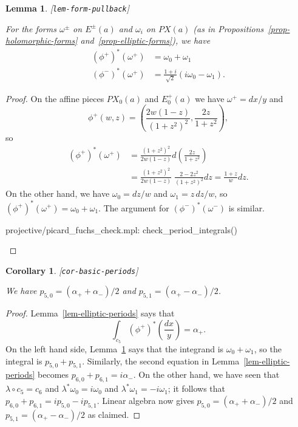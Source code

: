 \documentclass[reqno]{amsart}
\newcommand{\lbl}[1]{\label{#1}\textup{[\texttt{#1}]}\par}
\newcommand{\lbl}{\label}
\newcommand{\al}        {\alpha}
\newcommand{\lm}        {\lambda}
\newcommand{\om}        {\omega}
\newcommand{\rt}        {\sqrt{2}}
\renewcommand{\:}{\colon}
\newtheorem{lemma}[theorem]{Lemma}
\newtheorem{corollary}[theorem]{Corollary}
\theoremstyle{definition}
\begin{document}
\begin{lemma}\lbl{lem-form-pullback}
 For the forms $\om^{\pm}$ on $E^{\pm}(a)$ and $\om_i$ on $PX(a)$ (as in
 Propositions~\ref{prop-holomorphic-forms}
 and~\ref{prop-elliptic-forms}), we have
 \begin{align*}
  (\phi^+)^*(\om^+) &= \om_0+\om_1 \\
  (\phi^-)^*(\om^+) &= \frac{1+i}{\rt}(i\om_0-\om_1).
 \end{align*}
\end{lemma}
\begin{proof}
 On the affine pieces $PX_0(a)$ and $E^+_0(a)$ we have $\om^+=dx/y$
 and
 \[ \phi^+(w,z) = \left(\frac{2w(1-z)}{(1+z^2)^2},
                        \frac{2z}{1+z^2}\right),
 \]
 so
 \begin{align*}
  (\phi^+)^*(\om^+) &=
     \frac{(1+z^2)^2}{2w(1-z)}d\left(\frac{2z}{1+z^2}\right) \\
  &= \frac{(1+z^2)^2}{2w(1-z)} \; \frac{2-2z^2}{(1+z^2)^2}dz
   = \frac{1+z}{w}dz.
 \end{align*}
 On the other hand, we have $\om_0=dz/w$ and $\om_1=z\,dz/w$, so
 $(\phi^+)^*(\om^+)=\om_0+\om_1$.  The argument for
 $(\phi^-)^*(\om^-)$ is similar.
 \begin{checks}
  projective/picard_fuchs_check.mpl: check_period_integrals()
 \end{checks}
\end{proof}

\begin{corollary}\lbl{cor-basic-periods}
 We have $p_{5,0}=(\al_++\al_-)/2$ and $p_{5,1}=(\al_+-\al_-)/2$.
\end{corollary}
\begin{proof}
 Lemma~\ref{lem-elliptic-periods} says that
 \[ \int_{c_5}(\phi^+)^*\left(\frac{dx}{y}\right) = \al_+. \]
 On the left hand side, Lemma~\ref{lem-form-pullback} says that the
 integrand is $\om_0+\om_1$, so the integral is $p_{5,0}+p_{5,1}$.
 Similarly, the second equation in Lemma~\ref{lem-elliptic-periods}
 becomes $p_{6,0}+p_{6,1}=i\al_-$.  On the other hand, we have seen that
 $\lm\circ c_5=c_6$ and $\lm^*\om_0=i\om_0$ and $\lm^*\om_1=-i\om_1$;
 it follows that $p_{6,0}+p_{6,1}=ip_{5,0}-ip_{5,1}$.  Linear algebra
 now gives $p_{5,0}=(\al_++\al_-)/2$ and $p_{5,1}=(\al_+-\al_-)/2$ as
 claimed.
\end{proof}
\end{document}
